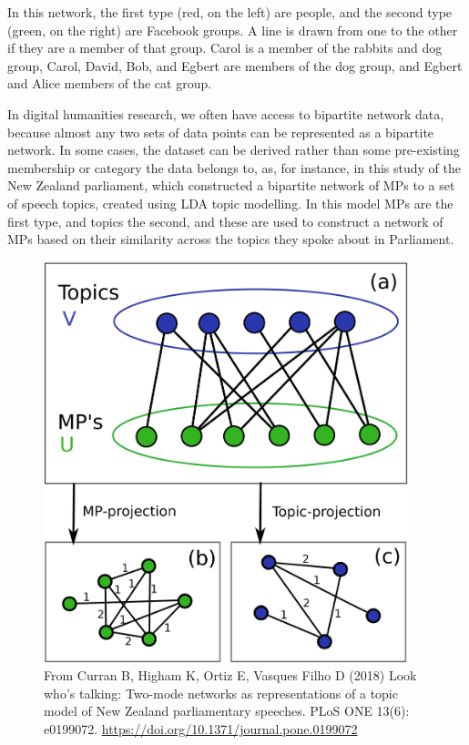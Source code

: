 \documentclass[
]{book}
\begin{document}
In this network, the first type (red, on the left) are people, and the second type (green, on the right) are Facebook groups. A line is drawn from one to the other if they are a member of that group. Carol is a member of the rabbits and dog group, Carol, David, Bob, and Egbert are members of the dog group, and Egbert and Alice members of the cat group.

In digital humanities research, we often have access to bipartite network data, because almost any two sets of data points can be represented as a bipartite network. In some cases, the dataset can be derived rather than some pre-existing membership or category the data belongs to, as, for instance, in this study of the New Zealand parliament, which constructed a bipartite network of MPs to a set of speech topics, created using LDA topic modelling. In this model MPs are the first type, and topics the second, and these are used to construct a network of MPs based on their similarity across the topics they spoke about in Parliament.

\begin{figure}
\centering
\includegraphics[width=4.16667in,height=\textheight]{images/nz_topics.png}
\caption{From Curran B, Higham K, Ortiz E, Vasques Filho D (2018) Look who's talking: Two-mode networks as representations of a topic model of New Zealand parliamentary speeches. PLoS ONE 13(6): e0199072. \url{https://doi.org/10.1371/journal.pone.0199072}}
\end{figure}
\end{document}
